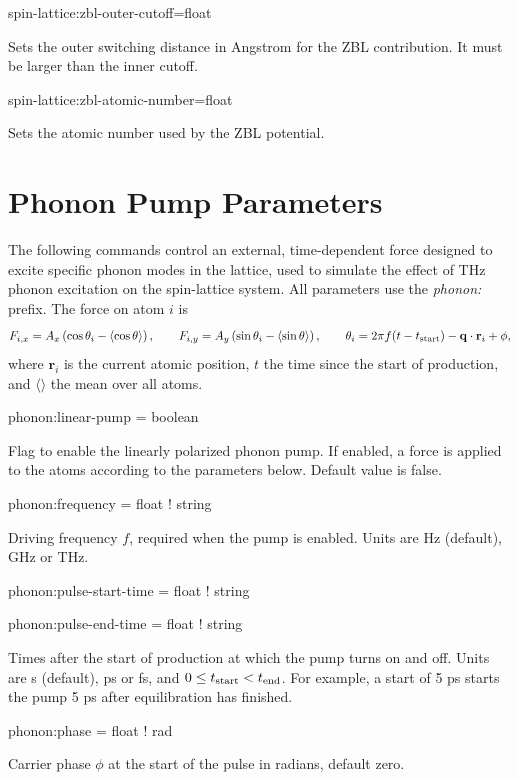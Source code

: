 {\zicf spin-lattice:zbl-outer-cutoff=float}
Sets the outer switching distance in Angstrom for the ZBL contribution. It must be larger than the inner cutoff.

{\zicf spin-lattice:zbl-atomic-number=float}
Sets the atomic number used by the ZBL potential.


\section*{Phonon Pump Parameters}
The following commands control an external, time-dependent force designed to excite specific phonon modes in the lattice, used to simulate the effect of THz phonon excitation on the spin-lattice system. All parameters use the \textit{phonon:} prefix. The force on atom $i$ is
\[
F_{i,x}=A_x\left(\cos\theta_i-\langle\cos\theta\rangle\right),\qquad
F_{i,y}=A_y\left(\sin\theta_i-\langle\sin\theta\rangle\right),\qquad
\theta_i=2\pi f (t-t_{\rm start})-\mathbf q\cdot\mathbf r_i+\phi,
\]
where $\mathbf r_i$ is the current atomic position, $t$ the time since the start of production, and $\langle\rangle$ the mean over all atoms.

{\zicf phonon:linear-pump = boolean}
Flag to enable the linearly polarized phonon pump. If enabled, a force is applied to the atoms according to the parameters below. Default value is false.

{\zicf phonon:frequency = float ! string}
Driving frequency $f$, required when the pump is enabled. Units are Hz (default), GHz or THz.

{\zicf phonon:pulse-start-time = float ! string}
{\zicf phonon:pulse-end-time = float ! string}
Times after the start of production at which the pump turns on and off. Units are s (default), ps or fs, and $0\le t_{\rm start}<t_{\rm end}$. For example, a start of 5 ps starts the pump 5 ps after equilibration has finished.

{\zicf phonon:phase = float ! rad}
Carrier phase $\phi$ at the start of the pulse in radians, default zero.

